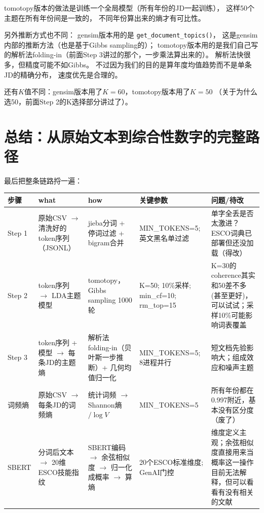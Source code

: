 \documentclass[12pt,a4paper]{ctexart}
\begin{document}
tomotopy版本的做法是训练一个全局模型（所有年份的JD一起训练），
这样50个主题在所有年份间是一致的，
不同年份算出来的熵才有可比性。

另外推断方式也不同：
gensim版本用的是 \texttt{get\_document\_topics()}，
这是gensim内部的推断方法（也是基于Gibbs sampling的）；
tomotopy版本用的是我们自己写的解析法folding-in（前面Step 3讲过的那个，一步乘法算出来的）。
解析法快很多，但精度可能不如Gibbs。
不过因为我们的目的是算年度均值趋势而不是单条JD的精确分布，
速度优先是合理的。

还有$K$值不同：gensim版本用了$K = 60$，tomotopy版本用了$K = 50$
（关于为什么选50，前面Step 2的K选择部分讲过了）。


\section{总结：从原始文本到综合性数字的完整路径}
\label{sec:summary}

最后把整条链路捋一遍：

\begin{longtable}{p{1.2cm}p{3.2cm}p{3.2cm}p{3cm}p{3.5cm}}
\toprule
\textbf{步骤} & \textbf{what} & \textbf{how} & \textbf{关键参数} & \textbf{问题/待改} \\
\midrule
\endhead

Step 1 &
原始CSV $\to$ 清洗好的token序列（JSONL） &
jieba分词 + 停词过滤 + bigram合并 &
MIN\_TOKENS=5; 英文黑名单过滤 &
单字全丢是否太激进？ESCO词典已部署但还没加载（得改） \\
\midrule

Step 2 &
token序列 $\to$ LDA主题模型 &
tomotopy，Gibbs sampling 1000轮 &
K=50; 10\%采样; min\_cf=10; rm\_top=15 &
K=30的coherence其实和50差不多(甚至更好)，可以试试；采样10\%可能影响词表覆盖 \\
\midrule

Step 3 &
token序列 + 模型 $\to$ 每条JD的主题熵 &
解析法folding-in（贝叶斯一步推断）+ 几何均值归一化 &
MIN\_TOKENS=5; 8进程并行 &
短文档先验影响大；组成效应和噪声主题 \\
\midrule

词频熵 &
原始CSV $\to$ 每条JD的词频熵 &
统计词频 $\to$ Shannon熵 $/ \log V$ &
MIN\_TOKENS=5 &
所有年份都在0.997附近，基本没有区分度（废了） \\
\midrule

SBERT &
分词后文本 $\to$ 20维ESCO技能指纹 &
SBERT编码 $\to$ 余弦相似度 $\to$ 归一化成概率 $\to$ 算熵 &
20个ESCO标准维度; GenAI门控 &
维度定义主观；余弦相似度直接用来当概率这一操作目前无法解释，但可以看看有没有相关的文献 \\
\bottomrule
\end{longtable}
\end{document}

